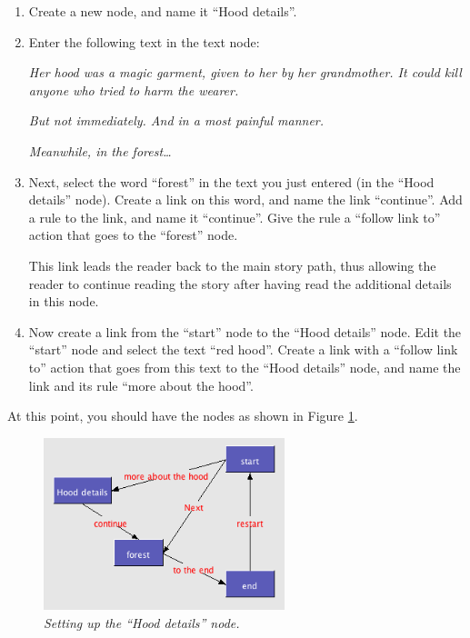 \documentclass{article}
\begin{document}
\begin{enumerate}
  \item Create a new node, and name it ``Hood details''.
  \item Enter the following text in the text node:

\textit{Her hood was a magic garment, given to her by her grandmother.
It could kill anyone who tried to harm the wearer.}

\textit{But not immediately. And in a most painful manner.}

\textit{Meanwhile, in the forest\ldots}

\item Next, select the word ``forest'' in the text you just entered (in the
``Hood details'' node). Create a link on this word, and name the link
``continue''. Add a rule to the link, and name it ``continue''. Give the rule a
``follow link to'' action that goes to the ``forest'' node.

This link leads the reader back to the main story path, thus allowing the
reader to continue reading the story after having read the additional details in
this node.

\item Now create a link from the ``start'' node to the ``Hood details'' node.
Edit the ``start'' node and select the text ``red hood''. Create a link with a
``follow link to'' action that goes from this text to the ``Hood details'' node,
and name the link and its rule ``more about the hood''.
\end{enumerate}

At this point, you should have the nodes as shown in Figure
\ref{fig:tut1:setting_up_hood_details}.

 
\begin{figure}[ht]
  \centering
  \includegraphics[width=7cm]{images/hypedyn-tutorial-1-figure-12}
  \caption{\textit{Setting up the ``Hood details'' node.}}
  \label{fig:tut1:setting_up_hood_details}
\end{figure} 
\end{document}
